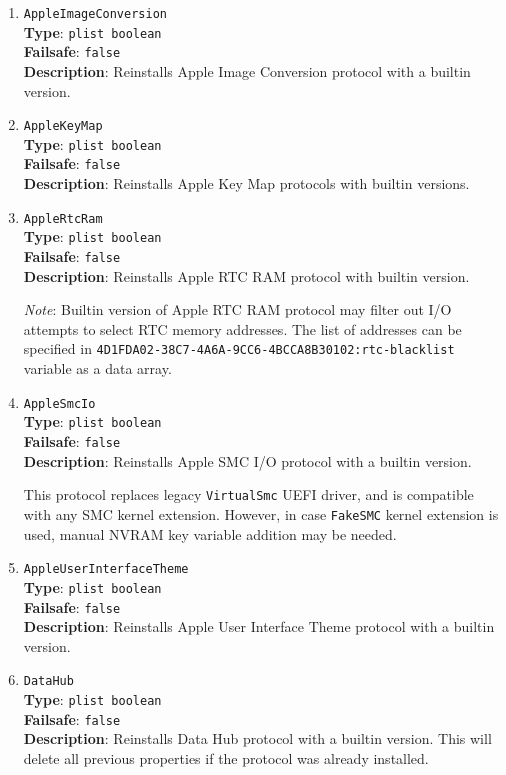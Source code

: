 \documentclass[]{article}
\begin{document}
\begin{enumerate}
\item
  \texttt{AppleImageConversion}\\
  \textbf{Type}: \texttt{plist\ boolean}\\
  \textbf{Failsafe}: \texttt{false}\\
  \textbf{Description}: Reinstalls Apple Image Conversion protocol with a builtin
  version.

\item
  \texttt{AppleKeyMap}\\
  \textbf{Type}: \texttt{plist\ boolean}\\
  \textbf{Failsafe}: \texttt{false}\\
  \textbf{Description}: Reinstalls Apple Key Map protocols with builtin
  versions.

\item
  \texttt{AppleRtcRam}\\
  \textbf{Type}: \texttt{plist\ boolean}\\
  \textbf{Failsafe}: \texttt{false}\\
  \textbf{Description}: Reinstalls Apple RTC RAM protocol with builtin
  version.

  \emph{Note}: Builtin version of Apple RTC RAM protocol may filter out
  I/O attempts to select RTC memory addresses. The list of addresses
  can be specified in \texttt{4D1FDA02-38C7-4A6A-9CC6-4BCCA8B30102:rtc-blacklist}
  variable as a data array.

\item
  \texttt{AppleSmcIo}\\
  \textbf{Type}: \texttt{plist\ boolean}\\
  \textbf{Failsafe}: \texttt{false}\\
  \textbf{Description}: Reinstalls Apple SMC I/O protocol with a builtin
  version.

  This protocol replaces legacy \texttt{VirtualSmc} UEFI driver, and is compatible
  with any SMC kernel extension. However, in case \texttt{FakeSMC} kernel extension
  is used, manual NVRAM key variable addition may be needed.

\item
  \texttt{AppleUserInterfaceTheme}\\
  \textbf{Type}: \texttt{plist\ boolean}\\
  \textbf{Failsafe}: \texttt{false}\\
  \textbf{Description}: Reinstalls Apple User Interface Theme protocol with a builtin
  version.

\item
  \texttt{DataHub}\\
  \textbf{Type}: \texttt{plist\ boolean}\\
  \textbf{Failsafe}: \texttt{false}\\
  \textbf{Description}: Reinstalls Data Hub protocol with a builtin version.
  This will delete all previous properties if the protocol was already installed.


\end{enumerate}
\end{document}
